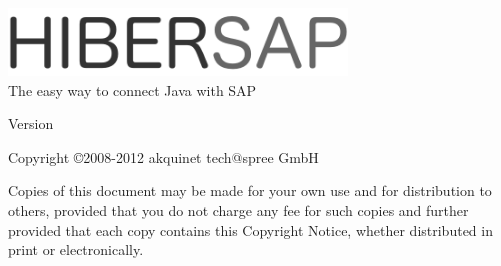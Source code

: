 \begin{titlepage}
	 \HRule 
	\begin{flushleft} 
	    \includegraphics[width=90mm]{HibersapLogo.png} \\
		\LARGE The easy way to connect Java with SAP \\
	\end{flushleft}
	\HRule {} 
	\begin{center} 
		\large Version \HibersapVersion 
	\end{center}
	\begin{center}
		\large Copyright \copyright 2008-2012 akquinet tech@spree GmbH
	\end{center}
	\begin{center} 
		Copies of this document may be made for your own use and for distribution to others, 
		provided that you do not charge any fee for such copies and further provided that each 
		copy contains this Copyright Notice, whether distributed in print or
		electronically.
	\end{center}
\end{titlepage}

